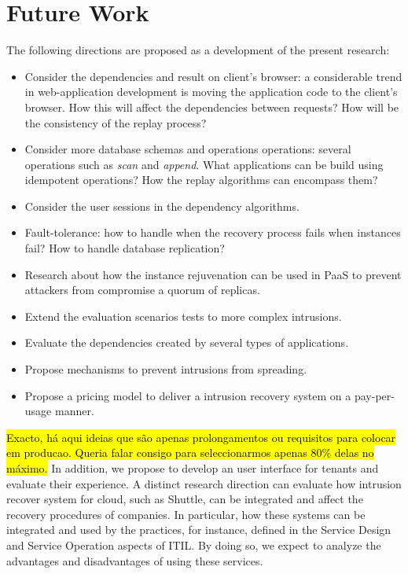 \section{Future Work}\label{sec:conclusion:future_work}
The following directions are proposed as a development of the present research:
\begin{itemize}
\item Consider the dependencies and result on client's browser: a considerable trend in web-application development is moving the application code to the client's browser. How this will affect the dependencies between requests? How will be the consistency of the replay process?
\item Consider more database schemas and operations operations: several operations such as \emph{scan} and \emph{append}. What applications can be build using idempotent operations? How the replay algorithms can encompass them?
\item Consider the user sessions in the dependency algorithms.
\item Fault-tolerance: how to handle when the recovery process fails when instances fail? How to handle database replication?
\item Research about how the instance rejuvenation can be used in \ac{PaaS} to prevent attackers from compromise a quorum of replicas.
\item Extend the evaluation scenarios tests to more complex intrusions.
\item Evaluate the dependencies created by several types of applications.
\item Propose mechanisms to prevent intrusions from spreading.
\item Propose a pricing model to deliver a intrusion recovery system on a pay-per-usage manner.
\end{itemize}


\hl{Exacto, há aqui ideias que são apenas prolongamentos ou requisitos para colocar em producao. Queria falar consigo para seleccionarmos apenas 80\% delas no máximo. }
In addition, we propose to develop an user interface for tenants and evaluate their experience. A distinct research direction can evaluate how intrusion recover system for cloud, such as Shuttle, can be integrated and affect the recovery procedures of companies. In particular, how these systems can be integrated and used by the practices, for instance, defined in the Service Design and Service Operation aspects of \ac{ITIL}. By doing so, we expect to analyze the advantages and disadvantages of using these services.

